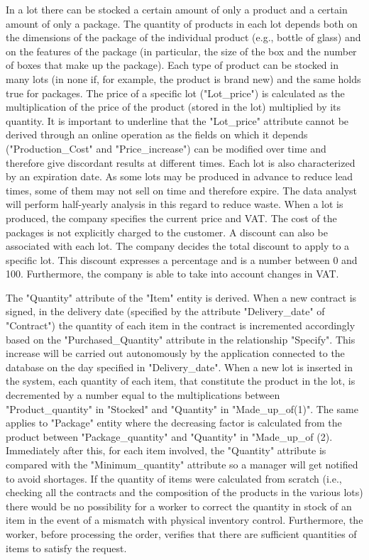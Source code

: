 In a lot there can be stocked a certain amount of only a product and a certain amount of only a package. The quantity of products in each lot depends both on the dimensions of the package of the individual product (e.g., bottle of glass) and on the features of the package (in particular, the size of the box and the number of boxes that make up the package). Each type of product can be stocked in many lots (in none if, for example, the product is brand new) and the same holds true for packages. The price of a specific lot ("Lot\_price") is calculated as the multiplication of the price of the product (stored in the lot) multiplied by its quantity. It is important to underline that the "Lot\_price" attribute cannot be derived through an online operation as the fields on which it depends ("Production\_Cost" and "Price\_increase") can be modified over time and therefore give discordant results at different times. Each lot is also characterized by an expiration date. As some lots may be produced in advance to reduce lead times, some of them may not sell on time and therefore expire. The data analyst will perform half-yearly analysis in this regard to reduce waste. When a lot is produced, the company specifies the current price and VAT. The cost of the packages is not explicitly charged to the customer. A discount can also be associated with each lot. The company decides the total discount to apply to a specific lot. This discount expresses a percentage and is a number between 0 and 100. Furthermore, the company is able to take into account changes in VAT.

The "Quantity" attribute of the "Item" entity is derived. When a new contract is signed, in the delivery date (specified by the attribute "Delivery\_date" of "Contract") the quantity of each item in the contract is incremented accordingly based on the "Purchased\_Quantity" attribute in the relationship "Specify". This increase will be carried out autonomously by the application connected to the database on the day specified in "Delivery\_date". When a new lot is inserted in the system, each quantity of each item, that constitute the product in the lot, is decremented by a number equal to the multiplications between "Product\_quantity" in "Stocked" and "Quantity" in "Made\_up\_of(1)". The same applies to "Package" entity where the decreasing factor is calculated from the product between "Package\_quantity" and "Quantity" in "Made\_up\_of (2). Immediately after this, for each item involved, the "Quantity" attribute is compared with the "Minimum\_quantity" attribute so a manager will get notified to avoid shortages. If the quantity of items were calculated from scratch (i.e., checking all the contracts and the composition of the products in the various lots) there would be no possibility for a worker to correct the quantity in stock of an item in the event of a mismatch with physical inventory control. Furthermore, the worker, before processing the order, verifies that there are sufficient quantities of items to satisfy the request.

